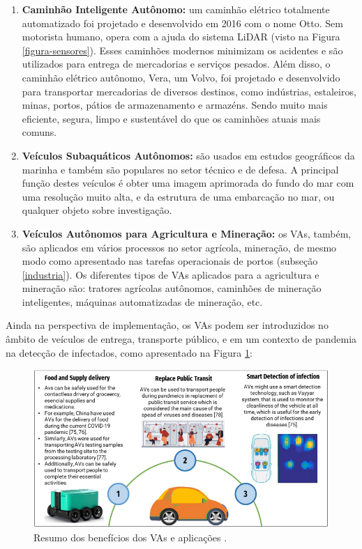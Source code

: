 \begin{enumerate}
\item \textbf{Caminhão Inteligente Autônomo:} um caminhão elétrico totalmente automatizado foi projetado e desenvolvido em 2016 com o nome Otto. Sem motorista humano, opera com a ajuda do sistema LiDAR (visto na Figura \ref{figura-sensores}). Esses caminhões modernos minimizam os acidentes e são utilizados para entrega de mercadorias e serviços pesados. Além disso, o caminhão elétrico autônomo, Vera, um Volvo, foi projetado e desenvolvido para transportar mercadorias de diversos destinos, como indústrias, estaleiros, minas, portos, pátios de armazenamento e armazéns. Sendo muito mais eficiente, segura, limpo e sustentável do que os caminhões atuais mais comuns.
\item \textbf{Veículos Subaquáticos Autônomos:} são usados em estudos geográficos da marinha e também são populares no setor técnico e de defesa. A principal função destes veículos é obter uma imagem aprimorada do fundo do mar com uma resolução muito alta, e da estrutura de uma embarcação no mar, ou qualquer objeto sobre investigação.
\item \textbf{Veículos Autônomos para Agricultura e Mineração:}  os VAs, também, são aplicados em vários processos no setor agrícola, mineração, de mesmo modo como apresentado nas tarefas operacionais de portos (subseção \ref{industria}). Os diferentes tipos de VAs aplicados para a agricultura e mineração são: tratores agrícolas autônomos, caminhões de mineração inteligentes, máquinas automatizadas de mineração, etc.
\end{enumerate}
Ainda na perspectiva de implementação, os VAs podem ser introduzidos no âmbito de veículos de entrega, transporte público, e em um contexto de pandemia na detecção de infectados, como apresentado na Figura \ref{resumo_aplic}:
\begin{figure}[H]
\centering
\includegraphics[width=\textwidth]{Figures/aplic.png}
\caption{Resumo dos benefícios dos VAs e aplicações \cite{mundobrasil}.}
\label{resumo_aplic}
\end{figure}

